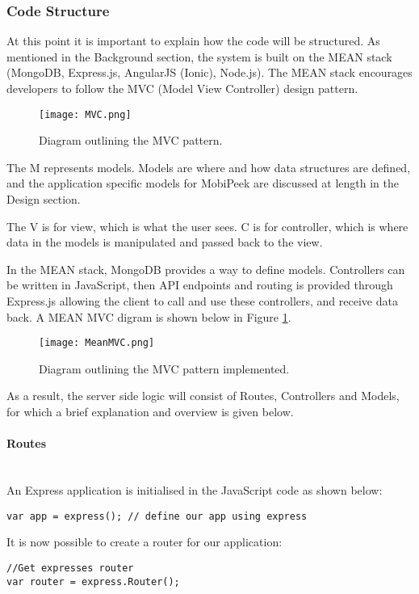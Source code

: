 \documentclass[a4paper]{article}
\newcommand{\subsubsubsection}[1]{\paragraph{#1}\mbox{}\\}
\begin{document}
\subsubsection{Code Structure}
At this point it is important to explain how the code will be structured. As  mentioned in the Background section, the system is built on the MEAN stack (MongoDB, Express.js, AngularJS (Ionic), Node.js). The MEAN stack encourages developers to follow the MVC (Model View Controller) design pattern. 

\begin{figure}[H]
  \caption{Diagram outlining the MVC pattern.}
  \centering
    \texttt{[image: MVC.png]}
\end{figure}
The M represents models. Models are where and how data structures are defined, and the application specific models for MobiPeek are discussed at length in the Design section.

The V is for view, which is what the user sees. C is for controller, which is where data in the models is manipulated and passed back to the view.

In the MEAN stack, MongoDB provides a way to define models. Controllers can be written in JavaScript, then API endpoints and routing is provided through Express.js allowing the client to call and use these controllers, and receive  data back. A MEAN MVC digram is shown below in Figure \ref{fig:meanMVC}.

\begin{figure}[H]
  \caption{Diagram outlining the MVC pattern implemented.}
  \centering
    \texttt{[image: MeanMVC.png]}
    \label{fig:meanMVC}
\end{figure}

As a result, the server side logic will consist of Routes, Controllers and Models, for which a brief explanation and overview is given below.

\subsubsubsection{Routes}
An Express application is initialised in the JavaScript code as shown below:

\begin{lstlisting}[label=Initialising an express.js app,caption=Initialising an express.js app]
var app = express(); // define our app using express
\end{lstlisting}

It is now possible to create a router for our application:

\begin{lstlisting}[label=Initialising an express.js router,caption=Initialising an express.js router]
//Get expresses router
var router = express.Router(); 
\end{lstlisting}
\end{document}
